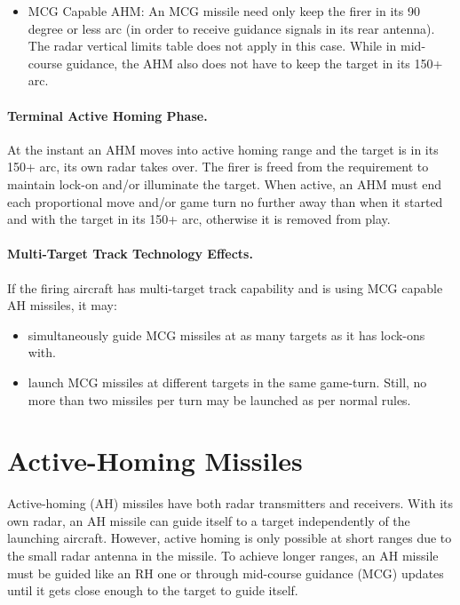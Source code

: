 {\begin{itemize}
    \item MCG Capable AHM: An MCG missile need only keep the firer in its 90 degree or less arc (in order to receive guidance signals in its rear antenna). The radar vertical limits table does not apply in this case. While in mid-course guidance, the AHM also does not have to keep the target in its 150+ arc.

\end{itemize}

\paragraph{Terminal Active Homing Phase.} At the instant an AHM moves into active homing range and the target is in its 150+ arc, its own radar takes over. The firer is freed from the requirement to maintain lock-on and/or illuminate the target.  When active, an AHM must end each proportional move and/or game turn no further away than when it started and with the target in its 150+ arc, otherwise it is removed from play.

\paragraph{Multi-Target Track Technology Effects.} If the firing aircraft has multi-target track capability and is using MCG capable AH missiles, it may:

\begin{itemize}

    \item simultaneously guide MCG missiles at as many targets as it has lock-ons with.

    \item launch MCG missiles at different targets in the same game-turn. Still, no more than two missiles per turn may be launched as per normal rules.

\end{itemize}
}{

\section{Active-Homing Missiles}
\label{rule:active-radar-homing-missiles}

Active-homing (AH) missiles have both radar transmitters and receivers. With its own radar, an AH missile can guide itself to a target independently of the launching aircraft. However, active homing is only possible at short ranges due to the small radar antenna in the missile. To achieve longer ranges, an AH missile must be guided like an RH one or through mid-course guidance (MCG) updates until it gets close enough to the target to guide itself.

}

